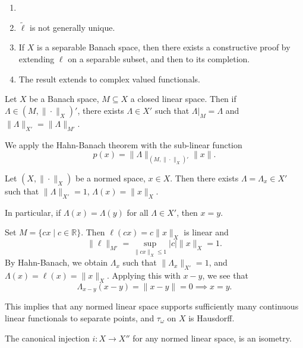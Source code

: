 \documentclass[12pt]{article}
\begin{document}
\begin{remark}
	\begin{enumerate}
		\item[]
		\item $\tilde \ell $ is not generally unique.
		\item If $X$ is a separable Banach space, then there exists a constructive proof by extending $\ell $ on a separable subset, and then to its completion.
		\item The result extends to complex valued functionals.
	\end{enumerate}	
\end{remark}

\begin{corollary}
	Let $X$ be a Banach space, $M \subseteq X$ a closed linear space. Then if $\Lambda \in (M, \|\cdot\|_X)'$, there exists $\Lambda \in X'$ such that $\Lambda|_M = \Lambda$ and $\|\Lambda\|_{X'}=\|\Lambda\|_{M'}$.
\end{corollary}

\begin{proofbox}
	We apply the Hahn-Banach theorem with the sub-linear function
	\[
	p(x) = \|\Lambda\|_{(M,\|\cdot\|_X)'} \|x\|.
	\]
\end{proofbox}


\begin{corollary}
	Let $(X, \|\cdot\|_X)$ be a normed space, $x \in X$. Then there exists $\Lambda = \Lambda_x \in X'$ such that $\|\Lambda\|_{X'} = 1$, $\Lambda(x) = \|x\|_X$.

	In particular, if $\Lambda(x) = \Lambda(y)$ for all $\Lambda \in X'$, then $x = y$.
\end{corollary}

\begin{proofbox}
	Set $M = \{cx \mid c \in \mathbb{R}\}$. Then $\ell(cx) = c \|x\|_X$ is linear and
	\[
	\|\ell \|_{M'} = \sup_{\|cx\|_X \leq 1} |c| \|x\|_X = 1.
	\]
	By Hahn-Banach, we obtain $\Lambda_x$ such that $\|\Lambda_x\|_{X'} = 1$, and $\Lambda(x) = \ell(x) = \|x\|_X$. Applying this with $x - y$, we see that
	\[
	\Lambda_{x - y}(x - y) = \|x - y\| = 0 \implies x = y.
	\]
\end{proofbox}

This implies that any normed linear space supports sufficiently many continuous linear functionals to separate points, and $\tau_\omega$ on $X$ is Hausdorff.

\begin{corollary}
	The canonical injection $i : X \to X''$ for any normed linear space, is an isometry.
\end{corollary}
\end{document}
